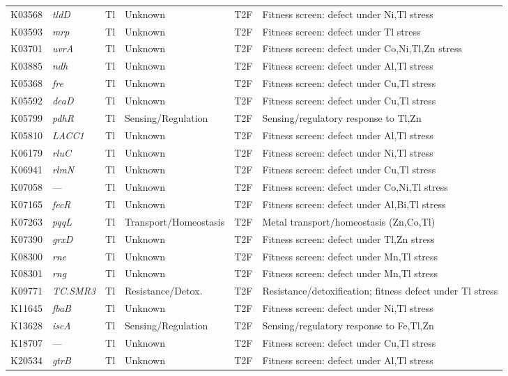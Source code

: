 \documentclass[11pt]{article}
\begin{document}
\begin{longtable}{lllllp{4.8cm}}
K03568 & \textit{tldD} & Tl & Unknown & T2F & Fitness screen: defect under Ni,Tl stress \\
K03593 & \textit{mrp} & Tl & Unknown & T2F & Fitness screen: defect under Tl stress \\
K03701 & \textit{uvrA} & Tl & Unknown & T2F & Fitness screen: defect under Co,Ni,Tl,Zn stress \\
K03885 & \textit{ndh} & Tl & Unknown & T2F & Fitness screen: defect under Al,Tl stress \\
K05368 & \textit{fre} & Tl & Unknown & T2F & Fitness screen: defect under Cu,Tl stress \\
K05592 & \textit{deaD} & Tl & Unknown & T2F & Fitness screen: defect under Cu,Tl stress \\
K05799 & \textit{pdhR} & Tl & Sensing/Regulation & T2F & Sensing/regulatory response to Tl,Zn \\
K05810 & \textit{LACC1} & Tl & Unknown & T2F & Fitness screen: defect under Al,Tl stress \\
K06179 & \textit{rluC} & Tl & Unknown & T2F & Fitness screen: defect under Ni,Tl stress \\
K06941 & \textit{rlmN} & Tl & Unknown & T2F & Fitness screen: defect under Cu,Tl stress \\
K07058 & --- & Tl & Unknown & T2F & Fitness screen: defect under Co,Ni,Tl stress \\
K07165 & \textit{fecR} & Tl & Unknown & T2F & Fitness screen: defect under Al,Bi,Tl stress \\
K07263 & \textit{pqqL} & Tl & Transport/Homeostasis & T2F & Metal transport/homeostasis (Zn,Co,Tl) \\
K07390 & \textit{grxD} & Tl & Unknown & T2F & Fitness screen: defect under Tl,Zn stress \\
K08300 & \textit{rne} & Tl & Unknown & T2F & Fitness screen: defect under Mn,Tl stress \\
K08301 & \textit{rng} & Tl & Unknown & T2F & Fitness screen: defect under Mn,Tl stress \\
K09771 & \textit{TC.SMR3} & Tl & Resistance/Detox. & T2F & Resistance/detoxification; fitness defect under Tl stress \\
K11645 & \textit{fbaB} & Tl & Unknown & T2F & Fitness screen: defect under Ni,Tl stress \\
K13628 & \textit{iscA} & Tl & Sensing/Regulation & T2F & Sensing/regulatory response to Fe,Tl,Zn \\
K18707 & --- & Tl & Unknown & T2F & Fitness screen: defect under Cu,Tl stress \\
K20534 & \textit{gtrB} & Tl & Unknown & T2F & Fitness screen: defect under Al,Tl stress \\
\end{longtable}
\end{document}
